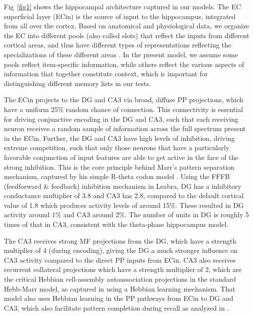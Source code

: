 \documentclass[10pt,letterpaper]{article}
\begin{document}
Fig~\ref{fig1} shows the hippocampal architecture captured in our models. The EC superficial layer (ECin) is the source of input to the hippocampus, integrated from all over the cortex.  Based on anatomical and physiological data, we organize the EC into different pools (also called slots) that reflect the inputs from different cortical areas, and thus have different types of representations reflecting the specializations of these different areas \cite{WitterDoanJacobsenEtAl17}.  In the present model, we assume some pools reflect item-specific information, while others reflect the various aspects of information that together constitute context, which is important for distinguishing different memory lists in our tests.

The ECin projects to the DG and CA3 via broad, diffuse PP projections, which have a uniform 25\% random chance of connection.  This connectivity is essential for driving conjunctive encoding in the DG and CA3, such that each receiving neuron receives a random sample of information across the full spectrum present in the ECin.  Further, the DG and CA3 have high levels of inhibition, driving extreme competition, such that only those neurons that have a particularly favorable conjunction of input features are able to get active in the face of the strong inhibition.  This is the core principle behind Marr's pattern separation mechanism, captured by his simple R-theta codon model \cite{Marr71}.  Using the FFFB (feedforward \& feedback) inhibition mechanism in Leabra, DG has a inhibitory conductance multiplier of 3.8 and CA3 has 2.8, compared to the default cortical value of 1.8 which produces activity levels of around 15\%.  These resulted in DG activity around 1\% and CA3 around 2\%.  The number of units in DG is roughly 5 times of that in CA3, consistent with the theta-phase hippocampus model.

The CA3 receives strong MF projections from the DG, which have a strength multiplier of 4 (during encoding), giving the DG a much stronger influence on CA3 activity compared to the direct PP inputs from ECin.  CA3 also receives recurrent collateral projections which have a strength multiplier of 2, which are the critical Hebbian cell-assembly autoassociation projections in the standard Hebb-Marr model, as captured in \cite{KetzMorkondaOReilly13} using a Hebbian learning mechanism.  That model also uses Hebbian learning in the PP pathways from ECin to DG and CA3, which also facilitate pattern completion during recall as analyzed in \cite{OReillyMcClelland94}.
\end{document}
